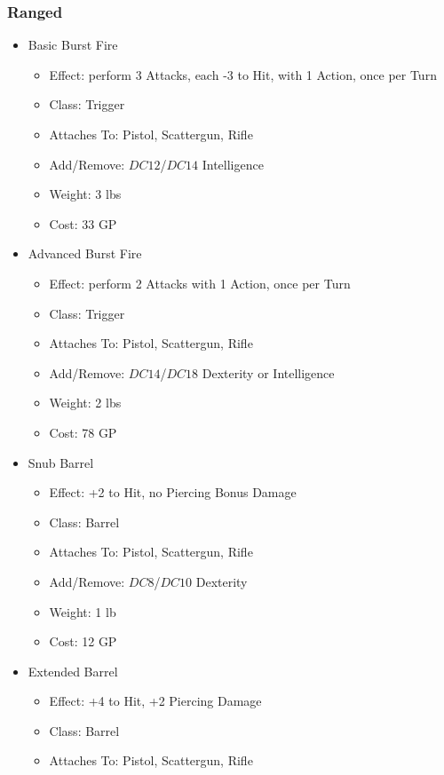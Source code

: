 \documentclass[12pt, landscape]{article}
\begin{document}
\begin{FlushLeft}
\begin{multicols}{2}
			\subsubsection{Ranged}
			\begin{itemize}[wide]
				\item Basic Burst Fire
				\begin{itemize}
					\item Effect: perform 3 Attacks, each -3 to Hit, with 1 Action, once per Turn
					\item Class: Trigger
					\item Attaches To: Pistol, Scattergun, Rifle
					\item Add/Remove: $DC12$/$DC14$ Intelligence
					\item Weight: 3 lbs
					\item Cost: 33 GP
				\end{itemize}
				\item Advanced Burst Fire
				\begin{itemize}
					\item Effect: perform 2 Attacks with 1 Action, once per Turn
					\item Class: Trigger
					\item Attaches To: Pistol, Scattergun, Rifle
					\item Add/Remove: $DC14$/$DC18$ Dexterity or Intelligence
					\item Weight: 2 lbs
					\item Cost: 78 GP
				\end{itemize}
				\item Snub Barrel
				\begin{itemize}
					\item Effect: +2 to Hit, no Piercing Bonus Damage  
					\item Class: Barrel
					\item Attaches To: Pistol, Scattergun, Rifle
					\item Add/Remove: $DC8$/$DC10$ Dexterity
					\item Weight: 1 lb
					\item Cost: 12 GP
				\end{itemize}
				\vfill \null \columnbreak
				\item Extended Barrel
				\begin{itemize}
					\item Effect: +4 to Hit, +2 Piercing Damage
					\item Class: Barrel
					\item Attaches To: Pistol, Scattergun, Rifle

\end{itemize}
\end{itemize}
\end{multicols}
\end{FlushLeft}
\end{document}
